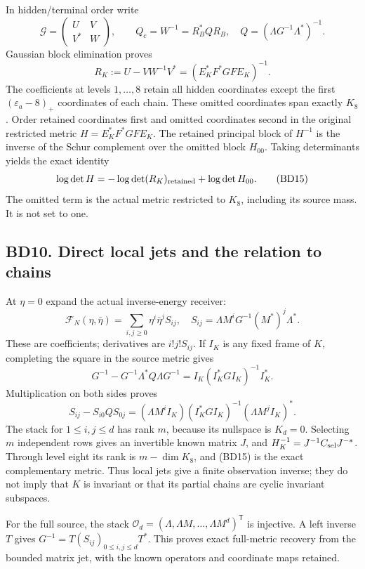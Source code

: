 \documentclass[11pt]{article}
\begin{document}
In hidden/terminal order write \[
\mathcal G=\begin{pmatrix}U&V\\V^*&W\end{pmatrix},\qquad
Q_c=W^{-1}=R_B^*QR_B,\quad Q=(\Lambda G^{-1}\Lambda^*)^{-1}.
\] Gaussian block elimination proves \[
R_K:=U-VW^{-1}V^*=(E_K^*F^*GF E_K)^{-1}. \tag{BD14}
\] The coefficients at levels \(1,\ldots,8\) retain all hidden coordinates except the first \((\varepsilon_a-8)_+\) coordinates of each chain. These omitted coordinates span exactly \(K_8\). Order retained coordinates first and omitted coordinates second in the original restricted metric \(H=E_K^*F^*GF E_K\). The retained principal block of \(H^{-1}\) is the inverse of the Schur complement over the omitted block \(H_{00}\). Taking determinants yields the exact identity \[
\log\det H=-\log\det(R_K)_{\rm retained}+\log\det H_{00}. \tag{BD15}
\] The omitted term is the actual metric restricted to \(K_8\), including its source mass. It is not set to one.

\subsection{BD10. Direct local jets and the relation to chains}\label{bd10.-direct-local-jets-and-the-relation-to-chains}

At \(\eta=0\) expand the actual inverse-energy receiver: \[
\mathcal F_N(\eta,\bar\eta)=\sum_{i,j\ge0}\eta^i\bar\eta^jS_{ij},\quad
S_{ij}=\Lambda M^iG^{-1}(M^*)^j\Lambda^*.
\] These are coefficients; derivatives are \(i!j!S_{ij}\). If \(I_K\) is any fixed frame of \(K\), completing the square in the source metric gives \[
G^{-1}-G^{-1}\Lambda^*Q\Lambda G^{-1}
=I_K(I_K^*GI_K)^{-1}I_K^*.
\] Multiplication on both sides proves \[
S_{ij}-S_{i0}QS_{0j}
=(\Lambda M^iI_K)(I_K^*GI_K)^{-1}(\Lambda M^jI_K)^*. \tag{BD16}
\] The stack for \(1\le i,j\le d\) has rank \(m\), because its nullspace is \(K_d=0\). Selecting \(m\) independent rows gives an invertible known matrix \(J\), and \(H_K^{-1}=J^{-1}C_{\rm sel}J^{-*}\). Through level eight its rank is \(m-\dim K_8\), and (BD15) is the exact complementary metric. Thus local jets give a finite observation inverse; they do not imply that \(K\) is invariant or that its partial chains are cyclic invariant subspaces.

For the full source, the stack \(\mathcal O_d=(\Lambda,\Lambda M,\ldots,\Lambda M^d)^{\mathsf T}\) is injective. A left inverse \(T\) gives \(G^{-1}=T(S_{ij})_{0\le i,j\le d}T^*\). This proves exact full-metric recovery from the bounded matrix jet, with the known operators and coordinate maps retained.
\end{document}
